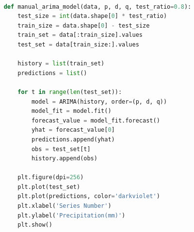 \documentclass{swmcmthesis}
\begin{document}
\begin{lstlisting}[language=Python,caption={The Python Source code of ARIMA}]
    
    def manual_arima_model(data, p, d, q, test_ratio=0.8):
        test_size = int(data.shape[0] * test_ratio)
        train_size = data.shape[0] - test_size
        train_set = data[:train_size].values
        test_set = data[train_size:].values
    
        history = list(train_set)
        predictions = list()
    
        for t in range(len(test_set)):
            model = ARIMA(history, order=(p, d, q))
            model_fit = model.fit()
            forecast_value = model_fit.forecast()
            yhat = forecast_value[0]
            predictions.append(yhat)
            obs = test_set[t]
            history.append(obs)
    
        plt.figure(dpi=256)
        plt.plot(test_set)
        plt.plot(predictions, color='darkviolet')
        plt.xlabel('Series Number')
        plt.ylabel('Precipitation(mm)')
        plt.show()
 \end{lstlisting}



\end{document}
